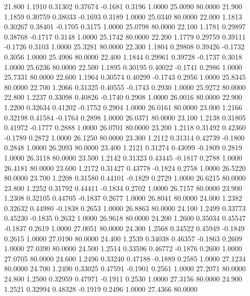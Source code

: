   21.800   1.1910   0.31302   0.37674  -0.1681   0.3196   1.0000  25.0090  80.0000
  21.900   1.1859   0.30759   0.38033  -0.1693   0.3189   1.0000  25.0340  80.0000
  22.000   1.1813   0.30267   0.38401  -0.1705   0.3175   1.0000  25.0798  80.0000
  22.100   1.1781   0.29897   0.38768  -0.1717   0.3148   1.0000  25.1742  80.0000
  22.200   1.1779   0.29759   0.39111  -0.1726   0.3103   1.0000  25.3281  80.0000
  22.300   1.1804   0.29808   0.39426  -0.1732   0.3056   1.0000  25.4906  80.0000
  22.400   1.1844   0.29961   0.39728  -0.1737   0.3018   1.0000  25.6236  80.0000
  22.500   1.1895   0.30195   0.40022  -0.1741   0.2986   1.0000  25.7331  80.0000
  22.600   1.1964   0.30574   0.40299  -0.1743   0.2956   1.0000  25.8345  80.0000
  22.700   1.2066   0.31325   0.40555  -0.1743   0.2930   1.0000  25.9272  80.0000
  22.800   1.2237   0.33098   0.40826  -0.1740   0.2908   1.0000  26.0016  80.0000
  22.900   1.2200   0.32634   0.41202  -0.1752   0.2904   1.0000  26.0161  80.0000
  23.000   1.2166   0.32198   0.41584  -0.1764   0.2898   1.0000  26.0371  80.0000
  23.100   1.2138   0.31805   0.41972  -0.1777   0.2888   1.0000  26.0701  80.0000
  23.200   1.2118   0.31492   0.42360  -0.1789   0.2872   1.0000  26.1250  80.0000
  23.300   1.2112   0.31314   0.42739  -0.1800   0.2848   1.0000  26.2093  80.0000
  23.400   1.2121   0.31274   0.43099  -0.1809   0.2819   1.0000  26.3118  80.0000
  23.500   1.2142   0.31323   0.43445  -0.1817   0.2788   1.0000  26.4181  80.0000
  23.600   1.2172   0.31427   0.43778  -0.1824   0.2758   1.0000  26.5220  80.0000
  23.700   1.2208   0.31580   0.44101  -0.1829   0.2729   1.0000  26.6215  80.0000
  23.800   1.2252   0.31792   0.44411  -0.1834   0.2702   1.0000  26.7157  80.0000
  23.900   1.2308   0.32105   0.44705  -0.1837   0.2677   1.0000  26.8041  80.0000
  24.000   1.2382   0.32632   0.44980  -0.1838   0.2653   1.0000  26.8863  80.0000
  24.100   1.2499   0.33773   0.45230  -0.1835   0.2632   1.0000  26.9618  80.0000
  24.200   1.2600   0.35034   0.45547  -0.1837   0.2619   1.0000  27.0051  80.0000
  24.300   1.2568   0.34522   0.45949  -0.1849   0.2615   1.0000  27.0190  80.0000
  24.400   1.2539   0.34038   0.46357  -0.1863   0.2609   1.0000  27.0390  80.0000
  24.500   1.2514   0.33596   0.46772  -0.1876   0.2600   1.0000  27.0705  80.0000
  24.600   1.2496   0.33240   0.47188  -0.1889   0.2585   1.0000  27.1234  80.0000
  24.700   1.2490   0.33025   0.47591  -0.1901   0.2561   1.0000  27.2071  80.0000
  24.800   1.2500   0.32959   0.47971  -0.1911   0.2530   1.0000  27.3156  80.0000
  24.900   1.2521   0.32994   0.48328  -0.1919   0.2496   1.0000  27.4366  80.0000
